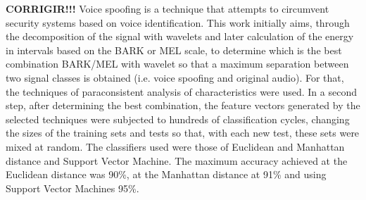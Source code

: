 \begin{myenv}{1.5}
	\fontsize{12}{\baselineskip} \selectfont \onehalfspacing
	\par \null
	\par \null
	\par \textbf{CORRIGIR!!!} Voice spoofing is a technique that attempts to circumvent security systems based on voice identification. This work initially aims, through the decomposition of the signal with wavelets and later calculation of the energy in intervals based on the BARK or MEL scale, to determine which is the best combination BARK/MEL with wavelet so that a maximum separation between two signal classes is obtained (i.e. voice spoofing and original audio). For that, the techniques of paraconsistent analysis of characteristics were used. In a second step, after determining the best combination, the feature vectors generated by the selected techniques were subjected to hundreds of classification cycles, changing the sizes of the training sets and tests so that, with each new test, these sets were mixed at random. The classifiers used were those of Euclidean and Manhattan distance and Support Vector Machine. The maximum accuracy achieved at the Euclidean distance was 90\%, at the Manhattan distance at 91\% and using Support Vector Machines 95\%.
\end{myenv}